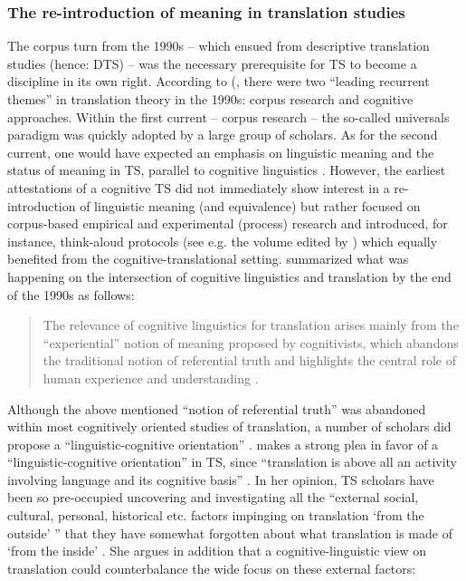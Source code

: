 \subsubsection{The re-introduction of meaning in translation studies}
\label{sec:2.2.3.2}  
The corpus turn from the 1990s – which ensued from descriptive translation studies (hence: DTS) – was the necessary prerequisite for TS to become a discipline in its own right. According to (\citet[41]{thelen_translation_2002}, there were two “leading recurrent themes” in translation theory in the 1990s: corpus research and cognitive approaches. Within the first current – corpus research – the so-called universals paradigm was quickly adopted by a large group of scholars. As for the second current, one would have expected an emphasis on linguistic meaning and the status of meaning in TS, parallel to cognitive linguistics \citep[41]{thelen_translation_2002}. However, the earliest attestations of a cognitive TS did not immediately show interest in a re-introduction of linguistic meaning (and equivalence) but rather focused on corpus-based empirical and experimental (process) research and introduced, for instance, think-aloud protocols (see e.g. the volume edited by \citealt{tirkkonen-condit_tapping_2000}) which equally benefited from the cognitive-translational setting. \citet{rojo_cognitive_2013} summarized what was happening on the intersection of cognitive linguistics and translation by the end of the 1990s as follows:

\begin{quote}
The relevance of cognitive linguistics for translation arises mainly from the “experiential” notion of meaning proposed by cognitivists, which abandons the traditional notion of referential truth and highlights the central role of human experience and understanding \citep[7]{rojo_cognitive_2013}.
\end{quote}

Although the above mentioned “notion of referential truth” was abandoned within most cognitively oriented studies of translation, a number of scholars did propose a “linguistic-cognitive orientation” \citep{house_towards_2013}. \citet{house_towards_2013} makes a strong plea in favor of a “linguistic-cognitive orientation” in TS, since “translation is above all an activity involving language and its cognitive basis” \citep[47]{house_towards_2013}. In her opinion, TS scholars have been so pre-occupied uncovering and investigating all the “external social, cultural, personal, historical etc. factors impinging on translation ‘from the outside’ ” that they have somewhat forgotten about what translation is made of ‘from the inside’ \citep[47]{house_towards_2013}. She argues in addition that a cognitive-linguistic view on translation could counterbalance the wide focus on these external factors:


